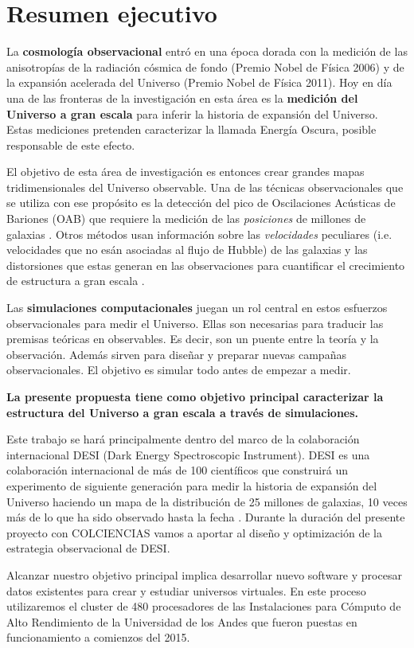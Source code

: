 
\section{Resumen ejecutivo}

La {\bf cosmología observacional} entró en una época dorada con la medición
de las anisotropías de la radiación cósmica de fondo (Premio Nobel de
Física 2006) y de la expansión acelerada del Universo
(Premio Nobel de Física 2011).  
Hoy en d\'ia una de las fronteras de la investigación en esta \'area 
es la {\bf medici\'on del Universo a gran escala} para inferir la
historia de expansión  del Universo.   Estas mediciones pretenden
caracterizar la llamada Energ\'ia Oscura, posible responsable de este
efecto.   

El objetivo de esta \'area de investigaci\'on es entonces crear
grandes mapas tridimensionales del Universo observable. 
Una de las t\'ecnicas observacionales que se utiliza con ese
prop\'osito es la detecci\'on del pico de Oscilaciones Ac\'usticas de
Bariones (OAB) que requiere la medici\'on de las \emph{posiciones} de
millones de galaxias \cite{Eisenstein2005}. 
Otros m\'etodos usan informaci\'on sobre las \emph{velocidades}
peculiares (i.e. velocidades que no es\'an asociadas al flujo de
Hubble) de las galaxias y las distorsiones que estas generan en las
observaciones para cuantificar el crecimiento de estructura a gran
escala \cite{Scoccimarro2004}. 

Las {\bf simulaciones computacionales} juegan un rol central en estos
esfuerzos observacionales para medir el Universo.
Ellas son necesarias para traducir las premisas te\'oricas
en observables. 
Es decir, son un puente entre la teor\'ia y la  observaci\'on. 
Adem\'as sirven para dise\~nar y preparar 
nuevas campa\~nas observacionales.  
El objetivo es simular todo antes de empezar a medir. 


{\bf La presente propuesta tiene como objetivo principal caracterizar
  la estructura del Universo a gran escala a trav\'es de simulaciones.}
  

Este trabajo se har\'a principalmente dentro del marco de la
colaboraci\'on internacional DESI (Dark Energy Spectroscopic
Instrument).  DESI es una colaboraci\'on internacional de m\'as de 100
cient\'ificos que construir\'a un experimento de siguiente
generaci\'on para medir la historia de expansi\'on del Universo
haciendo un mapa de la  distribuci\'on de 25 millones de galaxias, 10
veces m\'as de lo que ha sido observado hasta la fecha \cite{DESI}. 
Durante la duraci\'on del presente proyecto con COLCIENCIAS 
vamos a aportar al dise\~no y optimizaci\'on de la estrategia
observacional de DESI. 


Alcanzar nuestro objetivo principal implica desarrollar nuevo software
y procesar datos existentes para crear y estudiar universos virtuales.
En este proceso utilizaremos el cluster de 480 procesadores de
las Instalaciones para C\'omputo de Alto Rendimiento de  la
Universidad de los Andes que fueron puestas en funcionamiento a
comienzos del 2015. 

